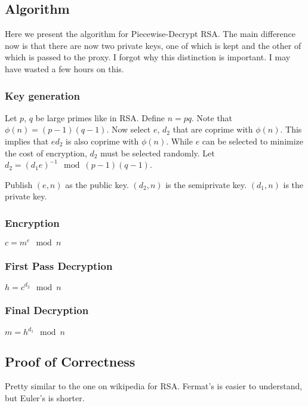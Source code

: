\documentclass{article}
\begin{document}
\subsection{Algorithm}
Here we present the algorithm for Piecewise-Decrypt RSA.  The main difference now is that there are now two private keys, one of which is kept and the other of which is passed  to the proxy.  I forgot why this distinction is important.  I may have wasted a few hours on this.
\subsubsection{Key generation}
Let $p$, $q$ be large primes like in RSA. Define $n = pq$. Note that $\phi(n) = (p-1)(q-1)$. Now select $e$, $d_2$ that are coprime with $\phi(n)$.  This implies that $ed_2$ is also coprime with $\phi(n)$.  While $e$ can be selected to minimize the cost of encryption, $d_2$ must be selected randomly.  Let $d_2 = (d_1e)^{-1} \mod(p-1)(q-1)$.  

Publish $(e,n)$ as the public key.  $(d_2, n)$ is the semiprivate key.  $(d_1, n)$ is the private key. 
\subsubsection{Encryption}
$c = m^{e} \mod n$
\subsubsection{First Pass Decryption}
$h = c^{d_2} \mod n$
\subsubsection{Final Decryption}
$m = h^{d_1} \mod n$
\subsection{Proof of Correctness}
Pretty similar to the one on wikipedia for RSA.  Fermat's is easier to understand, but Euler's is shorter.
\end{document}

